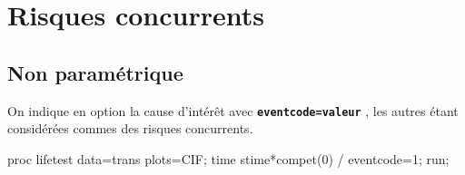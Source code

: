 \documentclass[
  12pt,
  letterpaper,
  DIV=11,
  numbers=noendperiod,
  onepage,
  openany]{scrreprt}
\newenvironment{Shaded}{\begin{snugshade}}{\end{snugshade}}
\newcommand{\DecValTok}[1]{\textcolor[rgb]{0.86,0.86,0.80}{#1}}
\newcommand{\FunctionTok}[1]{\textcolor[rgb]{0.94,0.94,0.56}{#1}}
\newcommand{\NormalTok}[1]{\textcolor[rgb]{0.80,0.80,0.80}{#1}}
\newcommand{\OtherTok}[1]{\textcolor[rgb]{0.94,0.94,0.56}{#1}}
\newcommand{\SpecialCharTok}[1]{\textcolor[rgb]{0.86,0.64,0.64}{#1}}
\begin{document}
\hypertarget{risques-concurrents-3}{%
\section{Risques concurrents}\label{risques-concurrents-3}}

\hypertarget{non-paramuxe9trique}{%
\subsection{Non paramétrique}\label{non-paramuxe9trique}}

On indique en option la cause d'intérêt avec
\textbf{\texttt{eventcode=valeur}} , les autres étant considérées commes
des risques concurrents.

\begin{Shaded}
\begin{Highlighting}[]
\NormalTok{proc lifetest data}\OtherTok{=}\NormalTok{trans plots}\OtherTok{=}\NormalTok{CIF;}
\NormalTok{time stime}\SpecialCharTok{*}\FunctionTok{compet}\NormalTok{(}\DecValTok{0}\NormalTok{) }\SpecialCharTok{/}\NormalTok{ eventcode}\OtherTok{=}\DecValTok{1}\NormalTok{; run;}
\end{Highlighting}
\end{Shaded}
\end{document}
